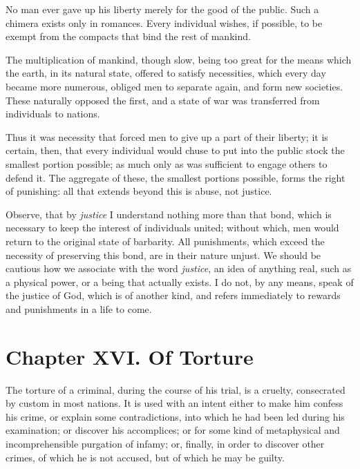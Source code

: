 No man ever gave up his liberty merely for the good of the public.
Such a chimera exists only in romances. Every individual wishes, if
possible, to be exempt from the compacts that bind the rest of
mankind.

The multiplication of mankind, though slow, being too great for the
means which the earth, in its natural state, offered to satisfy
necessities, which every day became more numerous, obliged men to
separate again, and form new societies. These naturally opposed the
first, and a state of war was transferred from individuals to nations.

Thus it was necessity that forced men to give up a part of their
liberty; it is certain, then, that every individual would chuse to put
into the public stock the smallest portion possible; as much only as
was sufficient to engage others to defend it. The aggregate of these,
the smallest portions possible, forms the right of punishing: all that
extends beyond this is abuse, not justice.

Observe, that by \textit{justice} I understand nothing more than that
bond, which is necessary to keep the interest of individuals united;
without which, men would return to the original state of barbarity.
All punishments, which exceed the necessity of  preserving
this bond, are in their nature unjust. We should be cautious how we
associate with the word \textit{justice}, an idea of anything real,
such as a physical power, or a being that actually exists. I do not,
by any means, speak of the justice of God, which is of another kind,
and refers immediately to rewards and punishments in a life to come.

\section*{Chapter XVI. Of Torture}

The torture of a criminal, during the course of his trial, is a
cruelty, consecrated by custom in most nations. It is used with an
intent either to make him confess his crime, or explain some
contradictions, into which he had been led during his examination; or
discover his accomplices; or for some kind of metaphysical and
incomprehensible purgation of infamy; or, finally, in order to
discover other crimes, of which he is not accused, but of which he may
be guilty.

